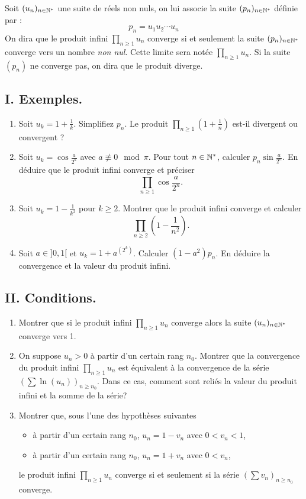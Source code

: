 Soit $(u_n)_{n\in \mathbb{N}^*}$ une suite de réels non nuls, on lui associe la suite $(p_n)_{n\in \mathbb{N}^*}$ définie par :
\[p_n=u_1 u_2 \cdots u_n\]
On dira que le produit infini $\prod_{n\geq 1}u_n$ converge si et seulement la suite $(p_n)_{n\in \mathbb{N}^*}$ converge vers un nombre \emph{non nul}. Cette limite sera notée  $\prod_{n\geq 1}u_n$. Si la suite $(p_n)$ ne converge pas, on dira que le produit diverge.
\subsection*{I. Exemples.}
\begin{enumerate}
  \item Soit $u_k = 1 + \frac{1}{k}$.\newline
  Simplifiez $p_n$. Le produit $\prod_{n\geq 1}(1+\frac{1}{n})$ est-il divergent ou convergent ?
  
  \item Soit $u_k=\cos \frac{a}{2^k}$ avec  $a \not \equiv 0 \mod \pi$.\newline
Pour tout $n\in \mathbb{N}^*$, calculer $p_n\sin\frac{a}{2^n}$. En déduire que le produit infini converge et préciser 
\[
 \prod_{n\geq 1}\cos \frac{a}{2^n} .
\]

  \item Soit $u_k = 1 - \frac{1}{k^2}$ pour $k\geq 2$. Montrer que le produit infini converge et calculer 
\[
 \prod_{n\geq 2}(1 - \frac{1}{n^2}).
\]

 \item Soit $a \in ]0,1[$ et $u_k = 1 + a^{(2^k)}$. Calculer $(1-a^2)p_n$. En déduire la convergence et la valeur du produit infini.  
\end{enumerate}

\subsection*{II. Conditions.}
\begin{enumerate}
 \item Montrer que si le produit infini $\prod_{n\geq 1}u_n$ converge alors la suite $(u_n)_{n\in \mathbb{N}^*}$ converge vers 1.
 
 \item On suppose $u_n >0$ à partir d'un certain rang $n_0$.\newline
 Montrer que la convergence du produit infini $\prod_{n\geq 1}u_n$ est équivalent à la convergence de la série $(\sum \ln(u_n))_{n \geq n_0}$. Dans ce cas, comment sont reliés la valeur du produit infini et la somme de la série?
 
 \item Montrer que, sous l'une des hypothèses suivantes
 \begin{itemize}
   \item à partir d'un certain rang $n_0$, $u_n = 1 - v_n$ avec $0 < v_n < 1$,
   \item à partir d'un certain rang $n_0$, $u_n = 1 + v_n$ avec $0 < v_n$,
 \end{itemize}
le produit infini $\prod_{n\geq 1} u_n$ converge si et seulement si la série  $ \left( \sum v_n \right)_{n\geq n_0}$ converge.
\end{enumerate}


